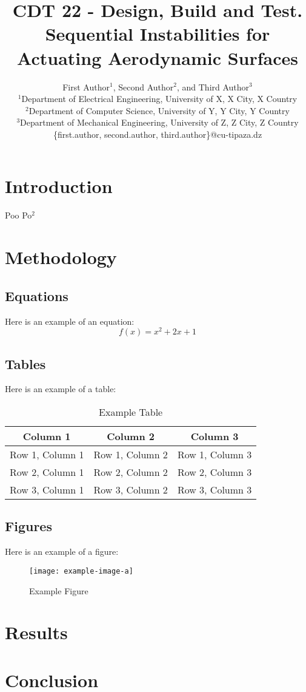 \documentclass{IEEEtran}
\title{CDT 22 - Design, Build and Test. Sequential Instabilities for Actuating Aerodynamic Surfaces}
\author{First Author$^1$, Second Author$^2$, and Third Author$^3$\\
	$^1$Department of Electrical Engineering, University of X, X City, X Country\\
	$^2$Department of Computer Science, University of Y, Y City, Y Country\\
	$^3$Department of Mechanical Engineering, University of Z, Z City, Z Country\\
	\{first.author, second.author, third.author\}@cu-tipaza.dz}
\begin{document}
	\maketitle
	
	\begin{abstract}
		
	\end{abstract}
	
	\section{Introduction}
	Poo \cite{Guest2006}
	Po$^2$
	\section{Methodology}
	
	
	\subsection{Equations}
	Here is an example of an equation:
	\begin{equation}
		f(x) = x^2 + 2x + 1
	\end{equation}
	
	\subsection{Tables}
	Here is an example of a table:
	\begin{table}[htbp]
		\centering
		\caption{Example Table}
		\label{tab:example}
		\begin{tabular}{|c|c|c|}
			\hline
			\textbf{Column 1} & \textbf{Column 2} & \textbf{Column 3} \\
			\hline
			Row 1, Column 1 & Row 1, Column 2 & Row 1, Column 3 \\
			\hline
			Row 2, Column 1 & Row 2, Column 2 & Row 2, Column 3 \\
			\hline
			Row 3, Column 1 & Row 3, Column 2 & Row 3, Column 3 \\
			\hline
		\end{tabular}
	\end{table}
	
	\subsection{Figures}
	Here is an example of a figure:
	\begin{figure}[htbp]
		\centering
		\texttt{[image: example-image-a]}
		\caption{Example Figure}
		\label{fig:example}
	\end{figure}
	
	\section{Results}
	
	\section{Conclusion}
	
	
    \printbibliography
	
\end{document}
